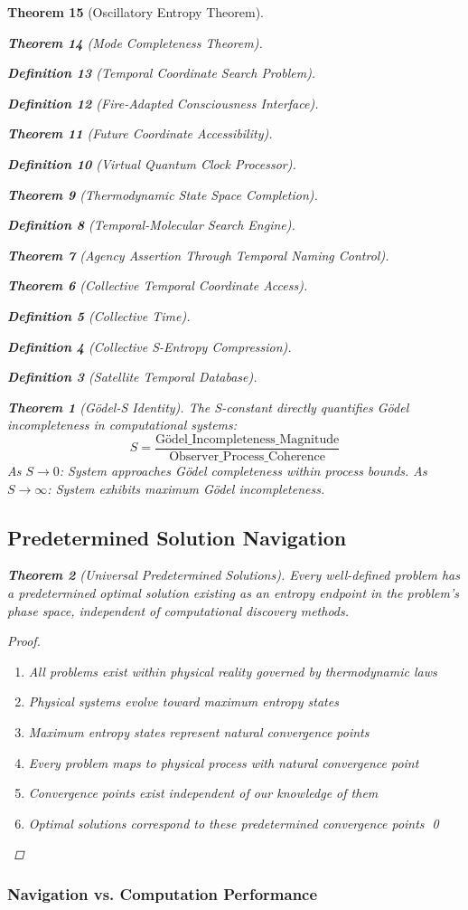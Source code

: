\documentclass[12pt,a4paper]{article}
\newtheorem{theorem}{Theorem}[section]
\newtheorem{definition}[theorem]{Definition}
\begin{document}
\begin{theorem}[Oscillatory Entropy Theorem]
\begin{theorem}[Mode Completeness Theorem]
\begin{enumerate}
\begin{definition}[Temporal Coordinate Search Problem]
\begin{algorithm}
\begin{definition}[Fire-Adapted Consciousness Interface]
\begin{theorem}[Future Coordinate Accessibility]
\begin{definition}[Virtual Quantum Clock Processor]
\begin{itemize}
\begin{itemize}
\begin{theorem}[Thermodynamic State Space Completion]
\begin{definition}[Temporal-Molecular Search Engine]
\begin{theorem}[Agency Assertion Through Temporal Naming Control]
\begin{remark}
\begin{theorem}[Collective Temporal Coordinate Access]
\begin{definition}[Collective Time]
\begin{definition}[Collective S-Entropy Compression]
\begin{definition}[Satellite Temporal Database]
\begin{algorithm}
\begin{table}[h]
{{\begin{theorem}[Gödel-S Identity]
The S-constant directly quantifies Gödel incompleteness in computational systems:
$$S = \frac{\text{Gödel\_Incompleteness\_Magnitude}}{\text{Observer\_Process\_Coherence}}$$
As $S \to 0$: System approaches Gödel completeness within process bounds.
As $S \to \infty$: System exhibits maximum Gödel incompleteness.
\end{theorem}

\subsection{Predetermined Solution Navigation}

\begin{theorem}[Universal Predetermined Solutions]
Every well-defined problem has a predetermined optimal solution existing as an entropy endpoint in the problem's phase space, independent of computational discovery methods.
\end{theorem}

\begin{proof}
\begin{enumerate}
\item All problems exist within physical reality governed by thermodynamic laws
\item Physical systems evolve toward maximum entropy states
\item Maximum entropy states represent natural convergence points
\item Every problem maps to physical process with natural convergence point
\item Convergence points exist independent of our knowledge of them
\item Optimal solutions correspond to these predetermined convergence points \qed
\end{enumerate}
\end{proof}

\subsubsection{Navigation vs. Computation Performance}

}}
\end{table}
\end{algorithm}
\end{definition}
\end{definition}
\end{definition}
\end{theorem}
\end{remark}
\end{theorem}
\end{definition}
\end{theorem}
\end{itemize}
\end{itemize}
\end{definition}
\end{theorem}
\end{definition}
\end{algorithm}
\end{definition}
\end{enumerate}
\end{theorem}
\end{theorem}
\end{document}
